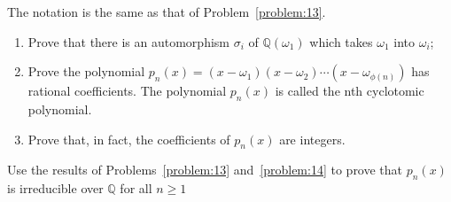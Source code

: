 \begin{problem}\label{problem:14}
The notation is the same as that of Problem~\ref{problem:13}.
\begin{enumerate}
	\item Prove that there is an automorphism $\sigma_{i}$ of
	      $\mathbb{Q}(\omega_{1})$ which takes $\omega_{1}$ into $\omega_{i}$;
	\item Prove the polynomial
	      $p_{n}(x)=(x-\omega_{1})(x-\omega_{2})\cdots(x-\omega_{\phi(n)})$ has
	      rational coefficients. The polynomial $p_{n}(x)$ is called the nth
	      cyclotomic polynomial.
	\item Prove that, in fact, the coefficients of $p_{n}(x)$ are integers.
\end{enumerate}
\end{problem}

\begin{problem}
Use the results of Problems~\ref{problem:13} and~\ref{problem:14} to prove that
$p_{n}(x)$ is irreducible over $\mathbb{Q}$ for all $n\geqslant{1}$
\end{problem}
